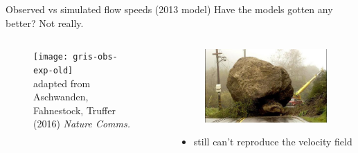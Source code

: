 \documentclass[hide notes,intlimits]{beamer}
\begin{document}
\begin{frame}{Observed vs simulated flow speeds (2013 model)}
  \alert{Have the models gotten any better? Not really.}
  \begin{columns}[c]
    \begin{column}{.6\linewidth}
    \begin{figure}
      \texttt{[image: gris-obs-exp-old]}
      \\ \tiny{adapted from Aschwanden, Fahnestock, Truffer (2016) \textit{Nature Comms.}}
    \end{figure}
    \end{column}
    \begin{column}{.4\linewidth}
      \begin{figure}
        \includegraphics[width=.75\textwidth]{roadblocks}
      \end{figure}
      \begin{itemize}
      \item still can't reproduce the velocity field
      \end{itemize}
    \end{column}
  \end{columns}
  \note[item]{}
\end{frame}
\end{document}
